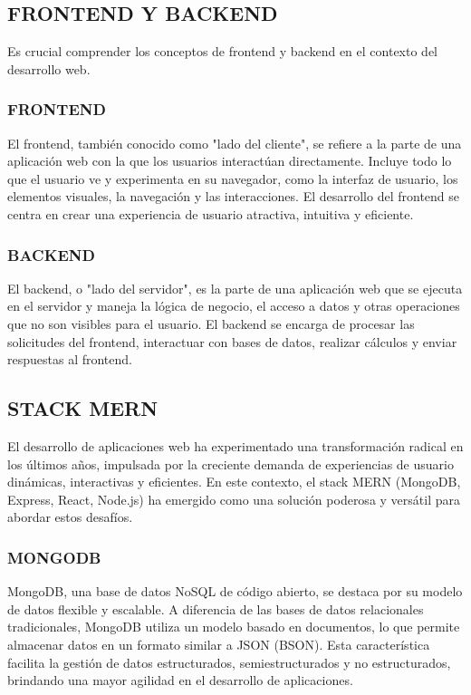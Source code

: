 \subsection{FRONTEND Y BACKEND}

Es crucial comprender los conceptos de frontend y backend en el contexto del desarrollo web.

\subsubsection{FRONTEND}
El frontend, también conocido como "lado del cliente", se refiere a la parte de una aplicación web con la que los usuarios interactúan directamente. Incluye todo lo que el usuario ve y experimenta en su navegador, como la interfaz de usuario, los elementos visuales, la navegación y las interacciones. El desarrollo del frontend se centra en crear una experiencia de usuario atractiva, intuitiva y eficiente. \citep{basham2018developing}

\subsubsection{BACKEND}
El backend, o "lado del servidor", es la parte de una aplicación web que se ejecuta en el servidor y maneja la lógica de negocio, el acceso a datos y otras operaciones que no son visibles para el usuario. El backend se encarga de procesar las solicitudes del frontend, interactuar con bases de datos, realizar cálculos y enviar respuestas al frontend. \citep{rahman2017learning}

\subsection{STACK MERN}

El desarrollo de aplicaciones web ha experimentado una transformación radical en los últimos años, impulsada por la creciente demanda de experiencias de usuario dinámicas, interactivas y eficientes. En este contexto, el stack MERN (MongoDB, Express, React, Node.js) ha emergido como una solución poderosa y versátil para abordar estos desafíos.

\subsubsection{MONGODB}
MongoDB, una base de datos NoSQL de código abierto, se destaca por su modelo de datos flexible y escalable. A diferencia de las bases de datos relacionales tradicionales, MongoDB utiliza un modelo basado en documentos, lo que permite almacenar datos en un formato similar a JSON (BSON). Esta característica facilita la gestión de datos estructurados, semiestructurados y no estructurados, brindando una mayor agilidad en el desarrollo de aplicaciones. \citep{choquet2018mongodb}

